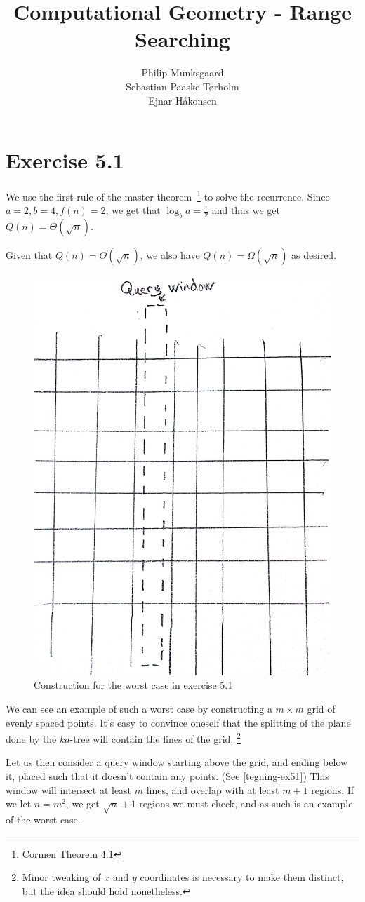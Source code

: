 \documentclass[11pt,a4paper]{article}
\title{Computational Geometry - Range Searching}
\author{Philip Munksgaard \\ Sebastian Paaske Tørholm \\ Ejnar Håkonsen}
\begin{document}
\maketitle

\section{Exercise 5.1}

We use the first rule of the master theorem~\footnote{Cormen Theorem 4.1}
to solve the recurrence. Since $a=2, b=4, f(n)=2$, we get that $\log_b a
= \frac{1}{2}$ and thus we get $Q(n) = \Theta(\sqrt{n})$.

Given that $Q(n) = \Theta(\sqrt{n})$, we also have $Q(n) = \Omega(\sqrt{n})$
as desired.

\begin{figure}[h!]
    \centering
    \includegraphics[width=.6\textwidth]{tegning-ex51.jpg}
    \caption{Construction for the worst case in exercise 5.1}
    \label{tegning-ex51}
\end{figure}

We can see an example of such a worst case by constructing a $m \times m$ grid
of evenly spaced points. It's easy to convince oneself that the splitting of
the plane done by the $kd$-tree will contain the lines of the grid.
\footnote{Minor tweaking of $x$ and $y$ coordinates is necessary to make
them distinct, but the idea should hold nonetheless.}

Let us then consider a query window starting above the grid, and ending below it,
placed such that it doesn't contain any points. (See \autoref{tegning-ex51})
This window will intersect at least $m$ lines, and overlap with at least $m+1$
regions. If we let $n = m^2$, we get $\sqrt{n}+1$ regions we must check, and
as such is an example of the worst case.
\end{document}
